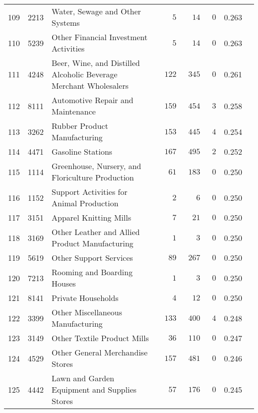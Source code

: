 \documentclass[9pt, oneside]{article}   	%
\begin{document}
\begin{longtable}{lcp{3 in}ccccc}
109  & 2213 & Water, Sewage and Other Systems & $\phantom{000}5$ & $\phantom{00}14$ & $\phantom{0}0$ & 0.263 \\
110  & 5239 & Other Financial Investment Activities & $\phantom{000}5$ & $\phantom{00}14$ & $\phantom{0}0$ & 0.263 \\
111  & 4248 & Beer, Wine, and Distilled Alcoholic Beverage Merchant Wholesalers & $\phantom{0}122$ & $\phantom{0}345$ & $\phantom{0}0$ & 0.261 \\
112  & 8111 & Automotive Repair and Maintenance & $\phantom{0}159$ & $\phantom{0}454$ & $\phantom{0}3$ & 0.258 \\
113  & 3262 & Rubber Product Manufacturing & $\phantom{0}153$ & $\phantom{0}445$ & $\phantom{0}4$ & 0.254 \\
114  & 4471 & Gasoline Stations & $\phantom{0}167$ & $\phantom{0}495$ & $\phantom{0}2$ & 0.252 \\
115  & 1114 & Greenhouse, Nursery, and Floriculture Production & $\phantom{00}61$ & $\phantom{0}183$ & $\phantom{0}0$ & 0.250 \\
116  & 1152 & Support Activities for Animal Production & $\phantom{000}2$ & $\phantom{000}6$ & $\phantom{0}0$ & 0.250 \\
117  & 3151 & Apparel Knitting Mills & $\phantom{000}7$ & $\phantom{00}21$ & $\phantom{0}0$ & 0.250 \\
118  & 3169 & Other Leather and Allied Product Manufacturing & $\phantom{000}1$ & $\phantom{000}3$ & $\phantom{0}0$ & 0.250 \\
119  & 5619 & Other Support Services & $\phantom{00}89$ & $\phantom{0}267$ & $\phantom{0}0$ & 0.250 \\
120  & 7213 & Rooming and Boarding Houses & $\phantom{000}1$ & $\phantom{000}3$ & $\phantom{0}0$ & 0.250 \\
121  & 8141 & Private Households & $\phantom{000}4$ & $\phantom{00}12$ & $\phantom{0}0$ & 0.250 \\
122  & 3399 & Other Miscellaneous Manufacturing & $\phantom{0}133$ & $\phantom{0}400$ & $\phantom{0}4$ & 0.248 \\
123  & 3149 & Other Textile Product Mills & $\phantom{00}36$ & $\phantom{0}110$ & $\phantom{0}0$ & 0.247 \\
124  & 4529 & Other General Merchandise Stores & $\phantom{0}157$ & $\phantom{0}481$ & $\phantom{0}0$ & 0.246 \\
125  & 4442 & Lawn and Garden Equipment and Supplies Stores & $\phantom{00}57$ & $\phantom{0}176$ & $\phantom{0}0$ & 0.245 \\

\end{longtable}
\end{document}
